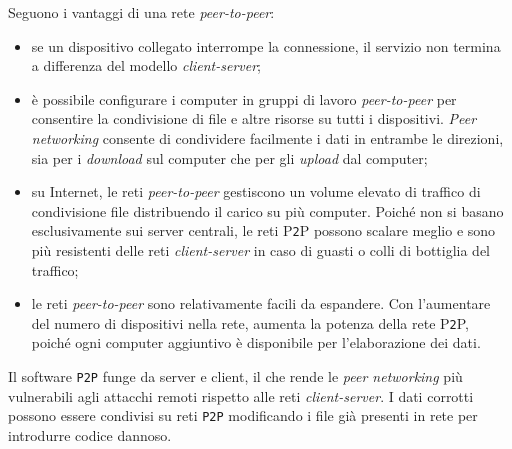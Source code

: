 Seguono i vantaggi di una rete \textit{peer-to-peer}:
\begin{itemize}
\item
se un dispositivo collegato interrompe la connessione, il servizio non termina a differenza del modello \textit{client-server};

\item 
\`{e} possibile configurare i computer in gruppi di lavoro \textit{peer-to-peer} per consentire la condivisione di file e altre risorse su tutti i dispositivi. \textit{Peer networking} consente di condividere facilmente i dati in entrambe le direzioni, sia per i \textit{download} sul computer che per gli \textit{upload} dal computer;

\item
su Internet, le reti \textit{peer-to-peer} gestiscono un volume elevato di traffico di condivisione file distribuendo il carico su pi\`{u} computer. Poich\'{e} non si basano esclusivamente sui server centrali, le reti P\verb"2"P possono scalare meglio e sono pi\`{u} resistenti delle reti \textit{client-server} in caso di guasti o colli di bottiglia del traffico;

\item
le reti \textit{peer-to-peer} sono relativamente facili da espandere. Con l'aumentare del numero di dispositivi nella rete, aumenta la potenza della rete P\verb"2"P, poich\'{e} ogni computer aggiuntivo \`{e} disponibile per l'elaborazione dei dati.\cite{etichetta14}
\end{itemize}

Il software \verb"P2P" funge da server e client, il che rende le \textit{peer networking} pi\`{u} vulnerabili agli attacchi remoti rispetto alle reti \textit{client-server}.
I dati corrotti possono essere condivisi su reti \verb"P2P" modificando i file gi\`{a} presenti in rete per introdurre codice dannoso.\cite{etichetta14}

\item

